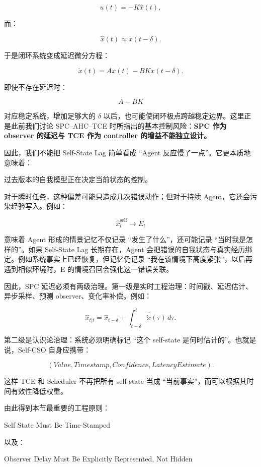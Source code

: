 \[
u(t)
=
-K\hat{x}(t),
\]

而：

\[
\hat{x}(t)
\approx
x(t-\delta).
\]

于是闭环系统变成延迟微分方程：

\[
\dot{x}(t)
=
Ax(t)
-
BKx(t-\delta).
\]

即使不存在延迟时：

\[
A-BK
\]

对应稳定系统，增加足够大的 $\delta$ 以后，也可能使闭环极点跨越稳定边界。这里正是此前我们讨论 SPC--AHC--TCE 时所指出的基本控制风险：\textbf{SPC 作为 observer 的延迟与 TCE 作为 controller 的增益不能独立设计。}

因此，我们不能把 Self-State Lag 简单看成 ``Agent 反应慢了一点''。它更本质地意味着：

\begin{statementbox}
过去版本的自我模型正在决定当前状态的控制。
\end{statementbox}

对于瞬时任务，这种偏差可能只造成几次错误动作；但对于持续 Agent，它还会污染经验写入。例如：

\[
\hat{x}_t^{\mathrm{self}}
\rightarrow
E_t
\]

意味着 Agent 形成的情景记忆不仅记录 ``发生了什么''，还可能记录 ``当时我是怎样的''。如果 Self-State Lag 长期存在，Agent 会把错误的自我状态与真实经历绑定。例如系统事实上已经恢复，但记忆仍记录 ``我在该情境下高度紧张''，以后再遇到相似环境时，E 的情境召回会强化这一错误关联。

因此，SPC 延迟必须有两级治理。第一级是实时工程治理：时间戳、延迟估计、异步采样、预测 observer、变化率补偿。例如：

\[
\hat{x}_{t|t}
=
\hat{x}_{t-\delta}
+
\int_{t-\delta}^{t}
\hat{\dot{x}}(\tau)\,d\tau.
\]

第二级是认识论治理：系统必须明确标记 ``这个 self-state 是何时估计的''。也就是说，Self-CSO 自身应携带：

\[
\left(
Value,
Timestamp,
Confidence,
LatencyEstimate
\right).
\]

这样 TCE 和 Scheduler 不再把所有 self-state 当成 ``当前事实''，而可以根据其时间有效性降低权重。

由此得到本节最重要的工程原则：

\begin{proposition*}
Self State Must Be Time-Stamped
\end{proposition*}

以及：

\begin{statementbox}
Observer Delay Must Be Explicitly Represented, Not Hidden
\end{statementbox}

